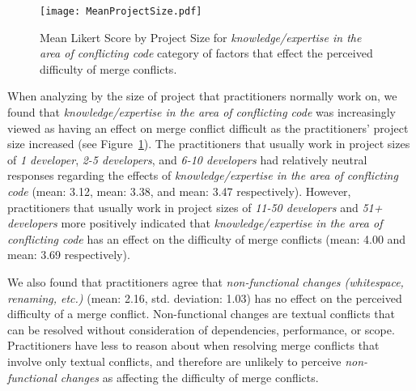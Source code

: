 \begin{figure}[!t]
\centering
\texttt{[image: MeanProjectSize.pdf]}
\caption{Mean Likert Score by Project Size for \textit{knowledge/expertise in the area of conflicting code} category of factors that effect the perceived difficulty of merge conflicts.}
\label{mean_likert_project_size}
\end{figure}

When analyzing by the size of project that practitioners normally work on, we found that \textit{knowledge/expertise in the area of conflicting code} was increasingly viewed as having an effect on merge conflict difficult as the practitioners' project size increased (see Figure~\ref{mean_likert_project_size}).
The practitioners that usually work in project sizes of \textit{1 developer}, \textit{2-5 developers}, and \textit{6-10 developers} had relatively neutral responses regarding the effects of \textit{knowledge/expertise in the area of conflicting code} (mean: 3.12, mean: 3.38, and mean: 3.47 respectively).
However, practitioners that usually work in project sizes of \textit{11-50 developers} and \textit{51+ developers} more positively indicated that \textit{knowledge/expertise in the area of conflicting code} has an effect on the difficulty of merge conflicts (mean: 4.00 and mean: 3.69 respectively).

We also found that practitioners agree that \textit{non-functional changes (whitespace, renaming, etc.)} (mean: 2.16, std. deviation: 1.03) has no effect on the perceived difficulty of a merge conflict.
Non-functional changes are textual conflicts that can be resolved without consideration of dependencies, performance, or scope.
Practitioners have less to reason about when resolving merge conflicts that involve only textual conflicts, and therefore are unlikely to perceive \textit{non-functional changes} as affecting the difficulty of merge conflicts.


